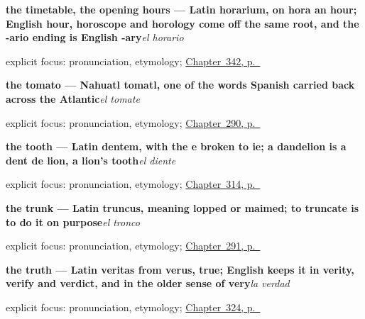 \noindent\begin{minipage}[t]{\linewidth}
\raggedright
\textbf{the timetable, the opening hours — Latin horarium, on hora an hour; English hour, horoscope and horology come off the same root, and the -ario ending is English -ary}\enspace\emph{el horario}\par
\footnotesize explicit focus: pronunciation, etymology; \hyperref[ch:el-minuto-y-el-cuarto]{Chapter~342, p.~\pageref*{ch:el-minuto-y-el-cuarto}}
\end{minipage}\par\smallskip

\noindent\begin{minipage}[t]{\linewidth}
\raggedright
\textbf{the tomato — Nahuatl tomatl, one of the words Spanish carried back across the Atlantic}\enspace\emph{el tomate}\par
\footnotesize explicit focus: pronunciation, etymology; \hyperref[ch:lo-que-se-come]{Chapter~290, p.~\pageref*{ch:lo-que-se-come}}
\end{minipage}\par\smallskip

\noindent\begin{minipage}[t]{\linewidth}
\raggedright
\textbf{the tooth — Latin dentem, with the e broken to ie; a dandelion is a dent de lion, a lion's tooth}\enspace\emph{el diente}\par
\footnotesize explicit focus: pronunciation, etymology; \hyperref[ch:brazo-y-pie]{Chapter~314, p.~\pageref*{ch:brazo-y-pie}}
\end{minipage}\par\smallskip

\noindent\begin{minipage}[t]{\linewidth}
\raggedright
\textbf{the trunk — Latin truncus, meaning lopped or maimed; to truncate is to do it on purpose}\enspace\emph{el tronco}\par
\footnotesize explicit focus: pronunciation, etymology; \hyperref[ch:de-la-semilla]{Chapter~291, p.~\pageref*{ch:de-la-semilla}}
\end{minipage}\par\smallskip

\noindent\begin{minipage}[t]{\linewidth}
\raggedright
\textbf{the truth — Latin veritas from verus, true; English keeps it in verity, verify and verdict, and in the older sense of very}\enspace\emph{la verdad}\par
\footnotesize explicit focus: pronunciation, etymology; \hyperref[ch:verdad-y-siquiera]{Chapter~324, p.~\pageref*{ch:verdad-y-siquiera}}
\end{minipage}\par\smallskip

